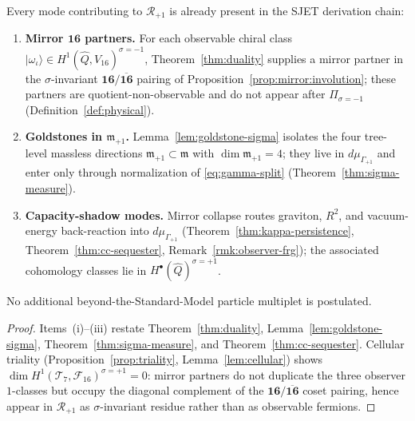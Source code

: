 \begin{proposition}\label{prop:dm-no-new}
Every mode contributing to $\mathcal{R}_{+1}$ is already present in the
SJET derivation chain:
\begin{enumerate}[label=(\roman*),leftmargin=*]
  \item \textbf{Mirror $\mathbf{16}$ partners.} For each observable chiral
    class $|\omega_\iota\rangle\in H^1(\hat Q,V_{16})^{\sigma=-1}$,
    Theorem~\ref{thm:duality} supplies a mirror partner in the
    $\sigma$-invariant $\mathbf{16}/\overline{\mathbf{16}}$ pairing of
    Proposition~\ref{prop:mirror:involution}; these partners are
    quotient-non-observable and do not appear after
    $\Pi_{\sigma=-1}$ (Definition~\ref{def:physical}).
  \item \textbf{Goldstones in $\mathfrak{m}_{+1}$.} Lemma~\ref{lem:goldstone-sigma}
    isolates the four tree-level massless directions
    $\mathfrak{m}_{+1}\subset\mathfrak{m}$ with
    $\dim\mathfrak{m}_{+1}=4$; they live in $d\mu_{\Gamma_{+1}}$ and enter
    only through normalization of \eqref{eq:gamma-split}
    (Theorem~\ref{thm:sigma-measure}).
  \item \textbf{Capacity-shadow modes.} Mirror collapse routes graviton,
    $R^2$, and vacuum-energy back-reaction into $d\mu_{\Gamma_{+1}}$
    (Theorem~\ref{thm:kappa-persistence}, Theorem~\ref{thm:cc-sequester},
    Remark~\ref{rmk:observer-frg}); the associated cohomology classes lie in
    $H^\bullet(\hat Q)^{\sigma=+1}$.
\end{enumerate}
No additional beyond-the-Standard-Model particle multiplet is postulated.
\end{proposition}

\begin{proof}
Items~(i)--(iii) restate Theorem~\ref{thm:duality},
Lemma~\ref{lem:goldstone-sigma}, Theorem~\ref{thm:sigma-measure}, and
Theorem~\ref{thm:cc-sequester}. Cellular triality
(Proposition~\ref{prop:triality}, Lemma~\ref{lem:cellular}) shows
$\dim H^1(\mathcal{T}_7,\mathcal{F}_{16})^{\sigma=+1}=0$: mirror partners do
not duplicate the three observer $1$-classes but occupy the diagonal complement
of the $\mathbf{16}/\overline{\mathbf{16}}$ coset pairing, hence appear in
$\mathcal{R}_{+1}$ as $\sigma$-invariant residue rather than as observable
fermions.
\end{proof}

